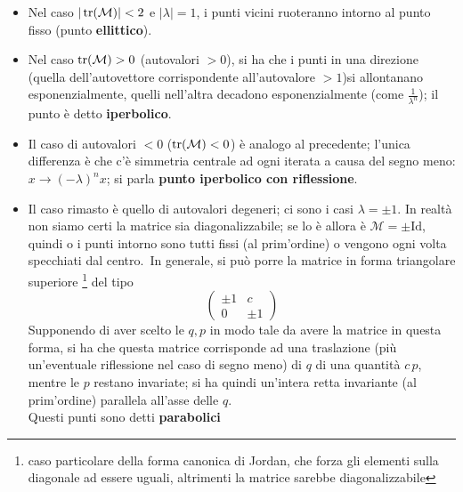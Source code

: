 \documentclass[a4paper,12pt]{article}
\theoremstyle{plain}
\theoremstyle{definition}
\newcommand{\Op}[1]{\mathcal{#1}}
\newcommand{\f}[2]{\frac{#1}{#2}}
\renewcommand{\unit}{\text{Id}}
\theoremstyle{remark}
\begin{document}
\begin{itemize}
\item 	Nel caso $|\tr(\Op{M})|<2$  e $|\lambda|=1$, i punti vicini ruoteranno intorno al punto fisso (punto \textbf{ellittico}).

\item Nel caso $\tr(\Op{M})>0$ (autovalori $>0$), si ha che i punti in una direzione (quella dell'autovettore corrispondente all'autovalore $>1$)si allontanano esponenzialmente, quelli nell'altra decadono esponenzialmente (come $\f{1}{\lambda^n}$); il punto è detto \textbf{iperbolico}.
\item Il caso di autovalori $<0$ ($\tr(\Op{M})<0$) è analogo al precedente; l'unica differenza è che c'è simmetria centrale ad ogni iterata a causa del segno meno: $x\rightarrow (-\lambda)^n x$; si parla \textbf{punto iperbolico con riflessione}.
\item Il caso rimasto è quello di autovalori degeneri; ci sono i casi  $\lambda=\pm1$.
In realtà non siamo certi la matrice sia diagonalizzabile; se lo è allora è $\Op{M}=\pm\unit$, quindi o i punti intorno sono tutti fissi (al prim'ordine) o vengono ogni volta specchiati dal centro.\
In generale, si può porre la matrice in forma triangolare superiore \footnote{caso particolare della forma canonica di Jordan, che forza gli elementi sulla diagonale ad essere uguali, altrimenti la matrice sarebbe diagonalizzabile} del tipo\[\begin{pmatrix}
\pm1&c\\
0&\pm 1
\end{pmatrix}\]
Supponendo di aver scelto le $q,p$ in modo tale da avere la matrice in questa forma,
si ha che questa matrice corrisponde ad una traslazione (più un'eventuale riflessione nel caso di segno meno)  di
 $q$ di una quantità $c\,p$, mentre le $p$ restano invariate; si ha quindi un'intera retta invariante (al prim'ordine) parallela all'asse delle $q$. \\Questi punti sono detti \textbf{parabolici }
\end{itemize}
\end{document}
